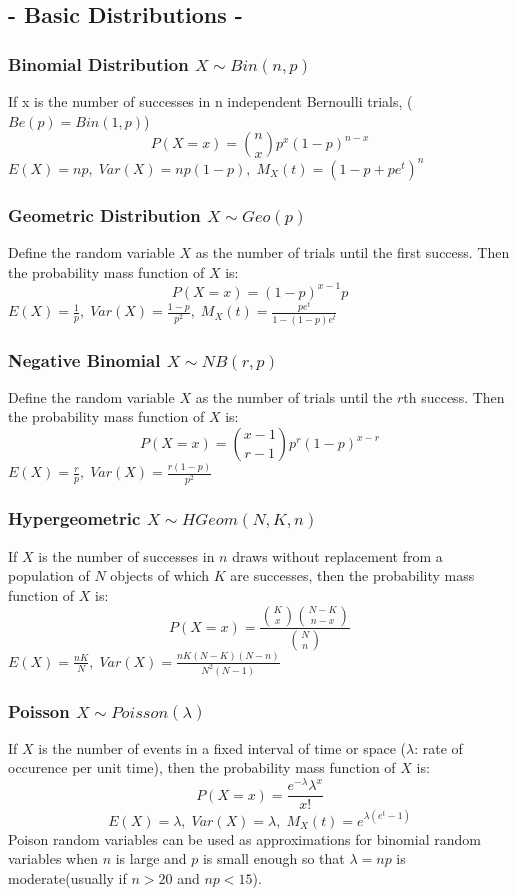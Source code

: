 \documentclass[a4paper,12pt]{article}
\begin{document}
\begin{multicols}{2}
\setlength{\columnseprule}{0.4pt}

\subsection*{- Basic Distributions -}
\subsubsection*{Binomial Distribution $X\sim Bin(n,p)$}
If x is the number of successes in n independent Bernoulli trials, ($Be(p)=Bin(1,p)$)
\[
P(X = x) = \binom{n}{x}p^x(1-p)^{n-x}
\]
$E(X) = np, \; Var(X) = np(1-p), \; M_X(t) = (1-p+pe^t)^n$

\subsubsection*{Geometric Distribution $X\sim Geo(p)$}
Define the random variable $X$ as the number of trials until the first success. Then the probability mass function of $X$ is:
\[
P(X = x) = (1-p)^{x-1}p
\]
$E(X) = \frac{1}{p}, \; Var(X) = \frac{1-p}{p^2}, \; M_X(t) = \frac{pe^t}{1-(1-p)e^t}$

\subsubsection*{Negative Binomial $X\sim NB(r,p)$}
Define the random variable $X$ as the number of trials until the $r$th success. Then the probability mass function of $X$ is:
\[
P(X = x) = \binom{x-1}{r-1}p^r(1-p)^{x-r}
\]
$E(X) = \frac{r}{p}, \; Var(X) = \frac{r(1-p)}{p^2}$

\subsubsection*{Hypergeometric $X\sim HGeom(N,K,n)$}
If $X$ is the number of successes in $n$ draws without replacement from a population of $N$ objects of which $K$ are successes, then the probability mass function of $X$ is:
\[
P(X = x) = \frac{\binom{K}{x}\binom{N-K}{n-x}}{\binom{N}{n}}
\]
$E(X) = \frac{nK}{N}, \; Var(X) = \frac{nK(N-K)(N-n)}{N^2(N-1)}$

\subsubsection*{Poisson $X\sim Poisson(\lambda)$}
If $X$ is the number of events in a fixed interval of time or space ($\lambda$: rate of occurence per unit time), then the probability mass function of $X$ is:
\[
P(X = x) = \frac{e^{-\lambda}\lambda^x}{x!}
\]
$$E(X) = \lambda, \;Var(X) = \lambda, \; M_X(t) = e^{\lambda(e^t-1)}$$
Poison random variables can be used as approximations for binomial random variables when $n$ is large and $p$ is small enough so that $\lambda = np$ is moderate(usually if $n>20$ and $np<15$). 


\end{multicols}
\end{document}
